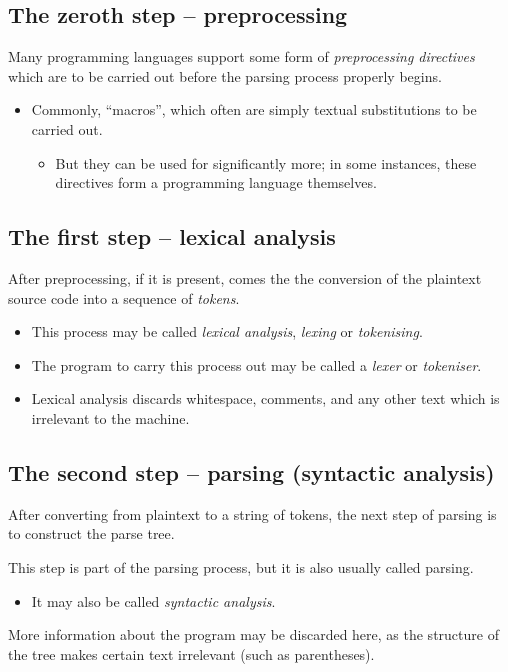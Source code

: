 \documentclass[11pt]{article}
\theoremstyle{definition}
\begin{document}
\subsection{The zeroth step – preprocessing}
\label{sec:org9757a9b}
Many programming languages support some form
of \emph{preprocessing directives} which are
to be carried out before the parsing process
properly begins.
\begin{itemize}
\item Commonly, “macros”, which often are simply
textual substitutions to be carried out.
\begin{itemize}
\item But they can be used for significantly more;
in some instances, these directives
form a programming language themselves.
\end{itemize}
\end{itemize}

\subsection{The first step – lexical analysis}
\label{sec:org5dd76c0}
After preprocessing, if it is present, comes the
the conversion of the plaintext source code
into a sequence of \emph{tokens}.
\begin{itemize}
\item This process may be
called \emph{lexical analysis}, \emph{lexing} or \emph{tokenising}.
\item The program to carry this process out may be
called a \emph{lexer} or \emph{tokeniser}.
\item Lexical analysis discards whitespace, comments, and any other
text which is irrelevant to the machine.
\end{itemize}

\subsection{The second step – parsing (syntactic analysis)}
\label{sec:org9e52d96}
After converting from plaintext to a string of tokens, the next
step of parsing is to construct the parse tree.

This step is part of the parsing process,
but it is also usually called parsing.
\begin{itemize}
\item It may also be called \emph{syntactic analysis}.
\end{itemize}

More information about the program may be discarded here,
as the structure of the tree makes certain text
irrelevant (such as parentheses).
\end{document}
